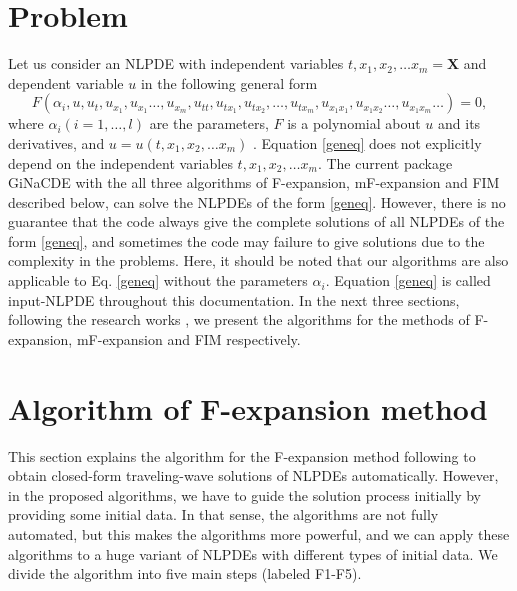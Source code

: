 \documentclass[prd,aps,floats,showkeys,nofootinbib,notitlepage]{revtex4-2}
\begin{document}
	\section{Problem}
	\par Let us consider an NLPDE with independent variables $t,x_1,x_2, \ldots x_m=\mathbf{X}$ and dependent variable $u$ in the following general form
	\begin{equation}\label{geneq}
		F\left( {\alpha_i,u,u_t,u_{x_1},u_{x_1} \ldots ,u_{x_m},u_{tt},u_{t{x_1}},u_{t{x_2}}, \ldots ,u_{t{x_m}},u_{{x_1}{x_1}},u_{{x_1}{x_2}} \ldots ,u_{{x_1}{x_m}} \ldots } \right) = 0,
	\end{equation}
	where $\alpha_i(i=1,\ldots,l)$ are the parameters, $F$ is a polynomial about $u$ and its derivatives, and $u=u(t,x_1,x_2, \ldots x_m)$ . Equation \eqref{geneq} does not explicitly depend on the independent variables $t,x_1,x_2, \ldots x_m$. The current package GiNaCDE with the all three algorithms of F-expansion, mF-expansion and FIM described below, can solve the NLPDEs of the form \eqref{geneq}. However, there is no guarantee that the code always give the complete solutions of all NLPDEs of the form \eqref{geneq}, and sometimes the code may failure to give solutions due to the complexity in the problems. Here, it should be noted that our algorithms are also applicable to Eq. \eqref{geneq} without the parameters $\alpha_i$. Equation \eqref{geneq} is called input-NLPDE throughout this documentation. 
	In the next three sections, following the research works \cite{fexpn024,fexpn024_1,fexpn123,0246,234,modfexpn,fim0,fim,mirza,complexTwt1}, we present the algorithms for the methods of F-expansion, mF-expansion and FIM respectively. 
	
	\section{Algorithm of F-expansion method}\label{sec:Fexpn}
	This section explains the algorithm for the F-expansion method following \cite{fexpn024,fexpn024_1,fexpn123,0246,234} to obtain closed-form traveling-wave solutions of NLPDEs automatically. However, in the proposed algorithms, we have to guide the solution process initially by providing some initial data. In that sense, the algorithms are not fully automated, but this makes the algorithms more powerful, and we can apply these algorithms to a huge variant of NLPDEs with different types of initial data.
	We divide the algorithm into five main steps (labeled F1-F5).  
	
\end{document}

